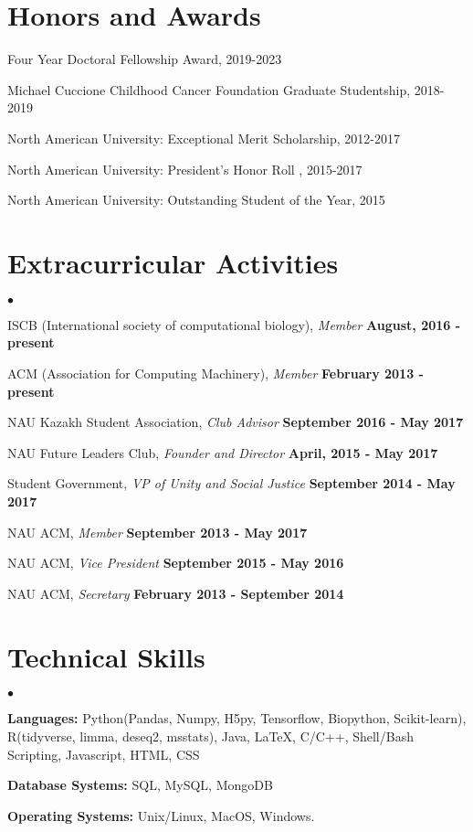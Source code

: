 \documentclass[margin,line]{res}
\newenvironment{list2}{
  \begin{list}{$\bullet$}{%
      \setlength{\itemsep}{0in}
      \setlength{\parsep}{0in} \setlength{\parskip}{0in}
      \setlength{\topsep}{0in} \setlength{\partopsep}{0in}
      \setlength{\leftmargin}{0.2in}}}{\end{list}}
\begin{document}
\begin{resume}
\vspace{\baselineskip}

\section{\sc Honors and Awards}

Four Year Doctoral Fellowship Award, 2019-2023

\vspace*{-2.5mm}

Michael Cuccione Childhood Cancer Foundation Graduate Studentship, 2018-2019

\vspace*{-2.5mm}
North American University: Exceptional Merit Scholarship, 2012-2017

\vspace*{-2.5mm}
North American University: President's Honor Roll , 2015-2017

\vspace*{-2.5mm}
North American University: Outstanding Student of the Year, 2015


\section{\sc Extracurricular Activities}
\begin{list2}
\item ISCB (International society of computational biology), {\em Member} \hfill {\bf August, 2016 - present}
\item ACM (Association for Computing Machinery), {\em Member} \hfill  {\bf February 2013 - present}
\item NAU Kazakh Student Association, {\em Club Advisor} \hfill {\bf September 2016 - May 2017}
\item NAU Future Leaders Club, {\em Founder and Director} \hfill {\bf April, 2015 - May 2017}
\item Student Government, {\em VP of Unity and Social Justice} \hfill  {\bf September 2014 - May 2017}
\item NAU ACM, {\em Member} \hfill {\bf September 2013 - May 2017}
\item NAU ACM, {\em Vice President} \hfill  {\bf September 2015 - May 2016}
\item NAU ACM, {\em Secretary} \hfill  {\bf February 2013 - September 2014}
\end{list2}

\section{\sc Technical Skills}
\begin{list2}
\item {\bf Languages:}  Python(Pandas, Numpy, H5py, Tensorflow, Biopython, Scikit-learn), R(tidyverse, limma, deseq2, msstats), Java, \LaTeX, C/C++, Shell/Bash Scripting, Javascript, HTML, CSS
\item {\bf Database Systems:} SQL, MySQL, MongoDB
\item {\bf Operating Systems:}  Unix/Linux, MacOS, Windows.
\end{list2}


\end{resume}
\end{document}
